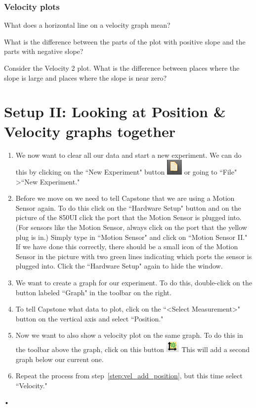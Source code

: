 \documentclass[main.tex]{subfiles}
\begin{document}
\subsubsection*{Velocity plots}
\begin{question}
What does a horizontal line on a velocity graph mean?
\end{question}
\begin{question}
What is the difference between the parts of the plot with positive slope and the parts with negative slope?
\end{question}
\begin{question}
Consider the Velocity 2 plot. What is the difference between places where the slope is large and places where the slope is near zero?
\end{question}

\section{Setup II: Looking at Position \& Velocity graphs together}
\begin{enumerate}
\item
We now want to clear all our data and start a new experiment. We can do this by clicking on the ``New Experiment" button \includegraphics{New_Experiment} or going to ``File" \textgreater ``New Experiment."
\item
Before we move on we need to tell Capstone that we are using a Motion Sensor again. To do this click on the ``Hardware Setup" button and on the picture of the 850UI click the port that the Motion Sensor is plugged into. (For sensors like the Motion Sensor, always click on the port that the yellow plug is in.) Simply type in ``Motion Sensor" and click on ``Motion Sensor II." If we have done this correctly, there should be a small icon of the Motion Sensor in the picture with two green lines indicating which ports the sensor is plugged into. Click the ``Hardware Setup" again to hide the window.
\item
We want to create a graph for our experiment. To do this, double-click on the button labeled ``Graph" in the toolbar on the right.
\item\label{step:vel_add_position}
To tell Capstone what data to plot, click on the ``\textless Select Measurement\textgreater" button on the vertical axis and select ``Position."
\item
Now we want to also show a velocity plot on the same graph. To do this in the toolbar above the graph, click on this button \includegraphics{Add_New_Plot}
 This will add a second graph below our current one.
\item
Repeat the process from step~\ref{step:vel_add_position}, but this time select ``Velocity."
\end{enumerate}•
\end{document}
